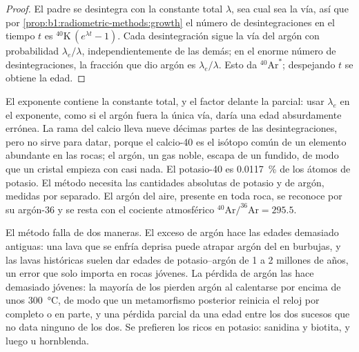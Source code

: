 \begin{proof}
El padre se desintegra con la constante total $\lambda$, sea cual sea la vía, así que por
\cref{prop:b1:radiometric-methods:growth} el número de desintegraciones en el tiempo $t$ es
${}^{40}\mathrm{K}\,(e^{\lambda t} - 1)$. Cada desintegración sigue la vía del argón con
probabilidad $\lambda_e/\lambda$, independientemente de las demás; en el enorme
número de desintegraciones, la fracción que dio argón es $\lambda_e/\lambda$. Esto
da ${}^{40}\mathrm{Ar}^*$; despejando $t$ se obtiene la edad.
\end{proof}

El exponente contiene la constante total, y el factor delante la parcial:
usar $\lambda_e$ en el exponente, como si el argón fuera la única vía, daría una edad
absurdamente errónea. La rama del calcio lleva nueve décimas partes de las desintegraciones, pero no sirve para datar, porque el calcio-40 es el isótopo común de un elemento
abundante en las rocas; el argón, un gas noble, escapa de un fundido, de modo que un cristal
empieza con casi nada. El potasio-40 es \qty{0.0117}{\percent} de los átomos de
potasio. El método necesita las cantidades absolutas de potasio y de argón, medidas por separado. El argón del aire, presente en toda roca, se reconoce por su argón-36 y se resta con el cociente atmosférico
$^{40}\mathrm{Ar}/^{36}\mathrm{Ar} = 295.5$.

El método falla de dos maneras. El exceso de argón hace las edades demasiado antiguas: una lava que se enfría deprisa puede atrapar argón del  en burbujas, y las lavas históricas
suelen dar edades de potasio--argón de 1 a 2 millones de años, un error que solo importa en rocas jóvenes. La pérdida de argón las hace demasiado jóvenes: la mayoría de los  pierden argón al calentarse por encima de unos \qty{300}{\celsius}, de modo que un metamorfismo posterior reinicia el reloj por completo o en parte, y una pérdida parcial da una edad entre los dos sucesos que no data ninguno de los dos. Se prefieren los  ricos en potasio: sanidina y biotita, y luego  u hornblenda.

